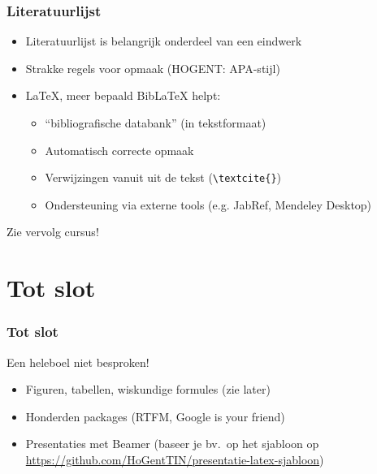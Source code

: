 \documentclass[aspectratio=169]{beamer}
\begin{document}
\begin{frame}[fragile]
  \frametitle{Literatuurlijst}

  \begin{itemize}
    \item<+-> Literatuurlijst is belangrijk onderdeel van een eindwerk
    \item<+-> Strakke regels voor opmaak (HOGENT: APA-stijl)
    \item<+-> {\LaTeX}, meer bepaald Bib{\LaTeX} helpt:
    \begin{itemize}
      \item<+-> ``bibliografische databank'' (in tekstformaat)
      \item<+-> Automatisch correcte opmaak
      \item<+-> Verwijzingen vanuit uit de tekst (\verb|\textcite{}|)
      \item<+-> Ondersteuning via externe tools (e.g. JabRef, Mendeley Desktop)
    \end{itemize}
  \end{itemize}

  \pause Zie vervolg cursus!
\end{frame}

\section{Tot slot}

\begin{frame}[fragile]
 \frametitle{Tot slot}

  Een heleboel niet besproken!

  \begin{itemize}
    \item<+-> Figuren, tabellen, wiskundige formules (zie later)
    \item<+-> Honderden packages (RTFM, Google is your friend)
    \item<+-> Presentaties met Beamer (baseer je bv.\ op het sjabloon op \url{https://github.com/HoGentTIN/presentatie-latex-sjabloon})

  \end{itemize}
\end{frame}
\end{document}
